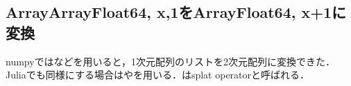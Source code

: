 \subsection{Array{Array{Float64, x},1}をArray{Float64, x+1}に変換}
numpyではなどを用いると，1次元配列のリストを2次元配列に変換できた．Juliaでも同様にする場合はやを用いる．はsplat operatorと呼ばれる．
